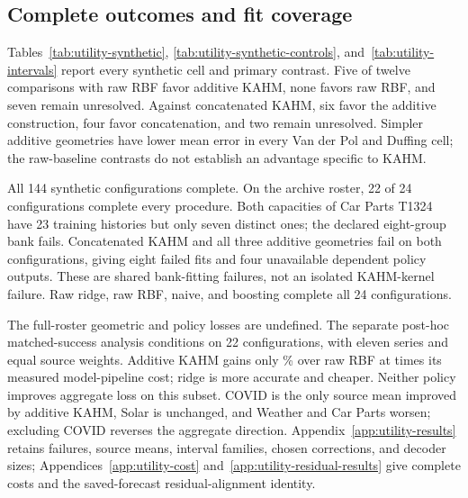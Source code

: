 \subsection{Complete outcomes and fit coverage}
\label{sec:utility-synthetic-results}\label{sec:utility-archive-results}
Tables~\ref{tab:utility-synthetic}, \ref{tab:utility-synthetic-controls},
and~\ref{tab:utility-intervals} report every synthetic cell and primary
contrast. Five of twelve comparisons with raw RBF favor additive KAHM,
none favors raw RBF, and seven remain unresolved. Against concatenated
KAHM, six favor the additive construction, four favor concatenation,
and two remain unresolved. Simpler additive geometries have lower mean
error in every Van der Pol and Duffing cell; the raw-baseline contrasts
do not establish an advantage specific to KAHM.



All 144 synthetic configurations complete. On the archive roster, 22
of 24 configurations complete every procedure. Both capacities of Car
Parts T1324 have 23 training histories but only seven distinct ones;
the declared eight-group bank fails. Concatenated KAHM and all three
additive geometries fail on both configurations, giving eight failed
fits and four unavailable dependent policy outputs. These are shared
bank-fitting failures, not an isolated KAHM-kernel failure. Raw ridge,
raw RBF, naive, and boosting complete all 24 configurations.



The full-roster geometric and policy losses are undefined. The separate
post-hoc matched-success analysis conditions on 22 configurations,
with eleven series and equal source weights. Additive KAHM gains only
\UtilityKAHMGainPercent\% over raw RBF at \UtilityKAHMCostRatio{}
times its measured model-pipeline cost; ridge is more accurate and
cheaper. Neither policy improves aggregate loss on this subset. COVID
is the only source mean improved by additive KAHM, Solar is unchanged,
and Weather and Car Parts worsen; excluding COVID reverses the
aggregate direction. Appendix~\ref{app:utility-results} retains failures,
source means, interval families, chosen corrections, and decoder sizes;
Appendices~\ref{app:utility-cost} and~\ref{app:utility-residual-results}
give complete costs and the saved-forecast residual-alignment identity.

